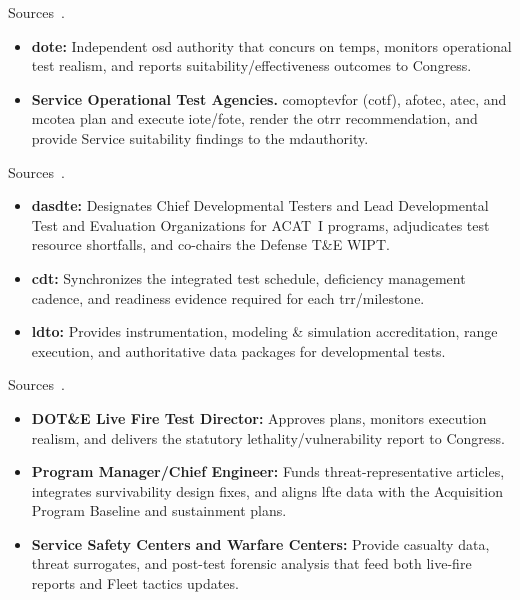\documentclass[../main.tex]{subfiles}
\begin{document}
\begin{description}[style=nextline, labelsep=0.5em, font=\bfseries]
\item[\textbf{Operational test oversight.}]
Sources~\autocite{DoDI5000-85,DoDAcqGuidebook}.
      \begin{itemize}
        \item \textbf{\ac{dote}:} Independent \ac{osd} authority that concurs on \ac{temp}s, monitors operational test realism, and reports suitability/effectiveness outcomes to Congress.
        \item \textbf{Service Operational Test Agencies.} \ac{comoptevfor} (\ac{cotf}), \ac{afotec}, \ac{atec}, and \ac{mcotea} plan and execute \ac{iote}/\ac{fote}, render the \ac{otrr} recommendation, and provide Service suitability findings to the \ac{mdauthority}.
      \end{itemize}
\item[\textbf{Developmental test governance.}]
Sources~\autocite{DoDI5000-89}.
      \begin{itemize}
        \item \textbf{\ac{dasdte}:} Designates Chief Developmental Testers and Lead Developmental Test and Evaluation Organizations for ACAT~I programs, adjudicates test resource shortfalls, and co-chairs the Defense T\&E WIPT.
        \item \textbf{\ac{cdt}:} Synchronizes the integrated test schedule, deficiency management cadence, and readiness evidence required for each \ac{trr}/milestone.
        \item \textbf{\ac{ldto}:} Provides instrumentation, modeling \& simulation accreditation, range execution, and authoritative data packages for developmental tests.
      \end{itemize}
\item[\textbf{Live-fire statutory leads.}]
Sources~\autocite{USC-10-2366,DoDI5000-89}.
      \begin{itemize}
        \item \textbf{DOT\&E Live Fire Test Director:} Approves plans, monitors execution realism, and delivers the statutory lethality/vulnerability report to Congress.
        \item \textbf{Program Manager/Chief Engineer:} Funds threat-representative articles, integrates survivability design fixes, and aligns \ac{lfte} data with the Acquisition Program Baseline and sustainment plans.
        \item \textbf{Service Safety Centers and Warfare Centers:} Provide casualty data, threat surrogates, and post-test forensic analysis that feed both live-fire reports and Fleet tactics updates.
      \end{itemize}


\end{description}
\end{document}

